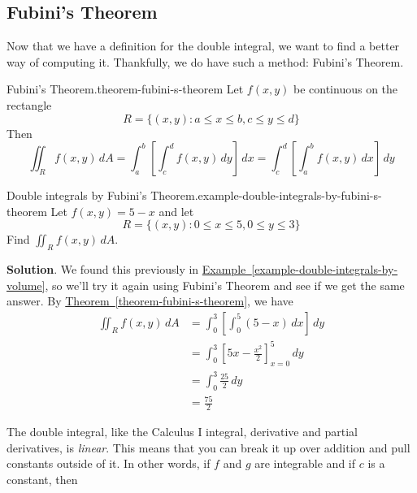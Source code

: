 \documentclass[10pt,]{book}
\numberwithin{equation}{section}
\begin{document}
\subsection[{Fubini's Theorem}]{Fubini's Theorem}\label{subsection-fubini-s-theorem}
\hypertarget{p-1463}{}%
Now that we have a definition for the double integral, we want to find a better way of computing it. Thankfully, we do have such a method: Fubini's Theorem.%
\begin{theorem}{Fubini's Theorem.}{}{theorem-fubini-s-theorem}%
\hypertarget{p-1464}{}%
Let \(f(x,y)\) be continuous on the rectangle%
\begin{equation*}
R = \{(x,y) : a\leq x\leq b, c\leq y\leq d\}
\end{equation*}
Then%
\begin{equation*}
\iint_{R}f(x,y)\,dA = \int_{a}^{b}\left[\int_{c}^{d}f(x,y)\,dy\right]\,dx = \int_{c}^{d}\left[\int_{a}^{b}f(x,y)\,dx\right]\,dy
\end{equation*}
%
\end{theorem}
\begin{example}{Double integrals by Fubini's Theorem.}{example-double-integrals-by-fubini-s-theorem}%
\hypertarget{p-1465}{}%
Let \(f(x,y) = 5 - x\) and let%
\begin{equation*}
R = \{(x,y) : 0\leq x\leq 5, 0\leq y\leq 3\}
\end{equation*}
Find \(\iint_{R}f(x,y)\,dA\).%
\par\smallskip%
\noindent\textbf{Solution}.\hypertarget{solution-239}{}\quad%
\hypertarget{p-1466}{}%
We found this previously in \hyperref[example-double-integrals-by-volume]{Example~\ref{example-double-integrals-by-volume}}, so we'll try it again using Fubini's Theorem and see if we get the same answer. By \hyperref[theorem-fubini-s-theorem]{Theorem~\ref{theorem-fubini-s-theorem}}, we have%
\begin{align*}
\iint_{R}f(x,y)\,dA & = \int_{0}^{3}\left[\int_{0}^{5}(5-x)\,dx\right]\,dy \\
& = \int_{0}^{3}\left[5x - \frac{x^{2}}{2}\right]_{x=0}^{5}\,dy \\
& = \int_{0}^{3}\frac{25}{2}\,dy \\
& = \frac{75}{2} 
\end{align*}
%
\end{example}
\hypertarget{p-1467}{}%
The double integral, like the Calculus I integral, derivative and partial derivatives, is \emph{linear}. This means that you can break it up over addition and pull constants outside of it. In other words, if \(f\) and \(g\) are integrable and if \(c\) is a constant, then%
\end{document}
